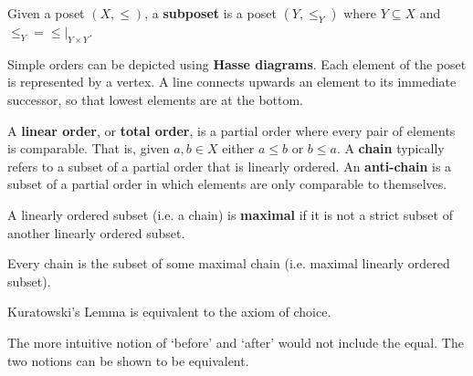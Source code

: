 \documentclass{bareminimum}
\begin{document}
\begin{defn}[Subposet]
	Given a poset $(X, \leq)$, a \textbf{subposet} is a poset $(Y, \leq_Y)$ where $Y \subseteq X$ and $\leq_Y = \leq |_{Y \times Y}$.
\end{defn}

Simple orders   can be depicted using \textbf{Hasse diagrams}. Each element of the poset is represented by a vertex. A line connects upwards an element to its immediate successor, so that lowest elements are at the bottom.

\begin{defn}
	A \textbf{linear order},  or \textbf{total order}, is a partial order where every pair of elements is comparable. That is, given $a, b \in X$ either $a \leq b$ or $b \leq a$. A \textbf{chain} typically refers to a subset of a partial order that is linearly ordered. An \textbf{anti-chain} is a subset of a partial order in which elements are only comparable to themselves.
\end{defn}

\begin{defn}
	A linearly  ordered subset (i.e. a chain) is \textbf{maximal} if it is not a strict subset of another linearly ordered subset.
\end{defn}


\begin{prop}
	Every chain is the subset of some maximal chain (i.e. maximal linearly ordered subset).
\end{prop}

\begin{prop}
	Kuratowski's Lemma is equivalent to the axiom of choice.
\end{prop}

The more intuitive notion of `before' and `after' would not include the equal. The two notions can be shown to be equivalent.
\end{document}
